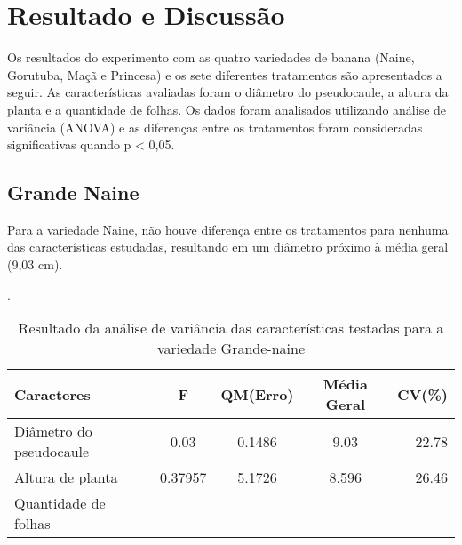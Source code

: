 \chapter{Resultado e Discussão}

Os resultados do experimento com as quatro variedades de banana (Naine, Gorutuba, Maçã e Princesa) e os sete diferentes tratamentos são apresentados a seguir. As características avaliadas foram o diâmetro do pseudocaule, a altura da planta e a quantidade de folhas. Os dados foram analisados utilizando análise de variância (ANOVA) e as diferenças entre os tratamentos foram consideradas significativas quando p < 0,05.
\section{Grande Naine}

Para a variedade Naine, não houve diferença entre os tratamentos para nenhuma das características estudadas, resultando em um diâmetro próximo à média geral (9,03 cm). 

\begin{table}[!htb]
 	\begin{center}
 		\caption{Resultado da análise de variância das características testadas para a variedade Grande-naine}.
	 	\begin{tabular*}{\textwidth}{@{\extracolsep{\fill}}lcccr}
 		\toprule
 		\toprule
 		\textbf{Caracteres} & \textbf{F}  & \textbf{QM(Erro)} & \textbf{Média Geral} &\textbf {CV(\%)} \\
		\hline
		Diâmetro do pseudocaule & 0.03 & 0.1486 & 9.03 &  22.78 \\
		Altura de planta &0.37957 &5.1726 & 8.596 &26.46 \\
		Quantidade de folhas & & & & \\
		\hline
		\hline
 		\end{tabular*}\\
 	\end{center}
\end{table}